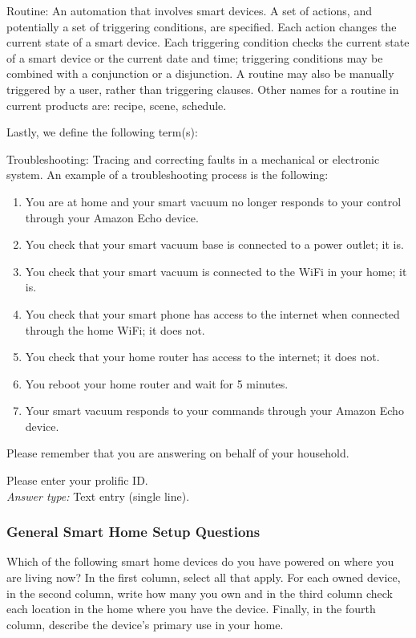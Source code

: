 Routine: An automation that involves smart devices. A set of actions, and potentially a set of triggering conditions, are specified. Each action changes the current state of a smart device. Each triggering condition checks the current state of a smart device or the current date and time; triggering conditions may be combined with a conjunction or a disjunction. A routine may also be manually triggered by a user, rather than triggering clauses. Other names for a routine in current products are: recipe, scene, schedule.

Lastly, we define the following term(s):

Troubleshooting: Tracing and correcting faults in a mechanical or electronic system. An example of a troubleshooting process is the following:

\begin{enumerate}
    \item You are at home and your smart vacuum no longer responds to your control through your Amazon Echo device.
    \item You check that your smart vacuum base is connected to a power outlet; it is.
    \item You check that your smart vacuum is connected to the WiFi in your home; it is.
    \item You check that your smart phone has access to the internet when connected through the home WiFi; it does not.
    \item You check that your home router has access to the internet; it does not.
    \item You reboot your home router and wait for 5 minutes.
    \item Your smart vacuum responds to your commands through your Amazon Echo device.
\end{enumerate}

Please remember that you are answering on behalf of your household.

\printQcounter{} Please enter your prolific ID.\\
\textit{Answer type:} Text entry (single line).

\subsubsection{General Smart Home Setup Questions}
\label{appdx:survey:general}

\printQcounter{} Which of the following smart home devices do you have powered on where you are living now? In the first column, select all that apply. For each owned device, in the second column, write how many you own and in the third column check each location in the home where you have the device. Finally, in the fourth column, describe the device's primary use in your home. 

